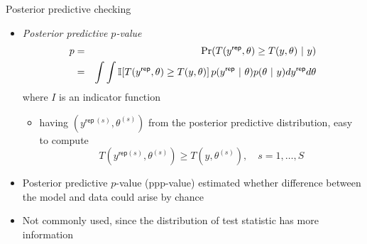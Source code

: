 \documentclass[aspectratio=169]{beamer}
\begin{document}

\begin{frame}[fragile]{Posterior predictive checking}

  \begin{itemize}
  \item<1-> \textit{Posterior predictive $p$-value}
    \begin{eqnarray*}
      p & = & \Pr(T(y^{\mathsf{rep}},\theta)\geq T(y,\theta)~\vert~ y)\\
      & = & \int\int
      \mathbb{I}[T(y^{\mathsf{rep}},\theta)\geq T(y,\theta)] \, p(y^{\mathsf{rep}}~\vert~ \theta)p(\theta ~\vert~ y)dy^{\mathsf{rep}}d\theta
    \end{eqnarray*}
    where $I$ is an indicator function
    \begin{itemize}
    \item<2->  having $(y^{\mathsf{rep}\,(s)},\theta^{(s)})$ from the posterior predictive
      distribution, easy to compute
      \begin{equation*}
        T(y^{\mathsf{rep} (s)},\theta^{(s)})\geq T(y,\theta^{(s)}), \quad s=1,\ldots,S
      \end{equation*}
    \end{itemize}
    \vspace{-1.5\baselineskip}
  \item<3-> Posterior predictive $p$-value (ppp-value) estimated whether
    difference between the model and data could arise by chance
  \item<4-> \color{black} Not commonly used, since the distribution of test
    statistic has more information
  \end{itemize}

\end{frame}




\end{document}
